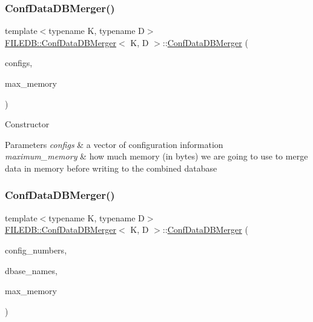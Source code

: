 \subsubsection{\texorpdfstring{ConfDataDBMerger()}{ConfDataDBMerger()}\hspace{0.1cm}{\footnotesize\ttfamily [3/4]}}
{\footnotesize\ttfamily template$<$typename K, typename D$>$ \\
\mbox{\hyperlink{classFILEDB_1_1ConfDataDBMerger}{F\+I\+L\+E\+D\+B\+::\+Conf\+Data\+D\+B\+Merger}}$<$ K, D $>$\+::\mbox{\hyperlink{classFILEDB_1_1ConfDataDBMerger}{Conf\+Data\+D\+B\+Merger}} (\begin{DoxyParamCaption}\item[{const std\+::vector$<$ \mbox{\hyperlink{classFILEDB_1_1ConfigInfo}{Config\+Info}} $>$ \&}]{configs,  }\item[{unsigned int}]{max\+\_\+memory }\end{DoxyParamCaption})\hspace{0.3cm}{\ttfamily [inline]}}

Constructor 
\begin{DoxyParams}{Parameters}
{\em configs} & a vector of configuration information \\
\hline
{\em maximum\+\_\+memory} & how much memory (in bytes) we are going to use to merge data in memory before writing to the combined database \\
\hline
\end{DoxyParams}
\mbox{\label{classFILEDB_1_1ConfDataDBMerger_a495cdfd447f2ed64776d87601c36a05b}} 
\subsubsection{\texorpdfstring{ConfDataDBMerger()}{ConfDataDBMerger()}\hspace{0.1cm}{\footnotesize\ttfamily [4/4]}}
{\footnotesize\ttfamily template$<$typename K, typename D$>$ \\
\mbox{\hyperlink{classFILEDB_1_1ConfDataDBMerger}{F\+I\+L\+E\+D\+B\+::\+Conf\+Data\+D\+B\+Merger}}$<$ K, D $>$\+::\mbox{\hyperlink{classFILEDB_1_1ConfDataDBMerger}{Conf\+Data\+D\+B\+Merger}} (\begin{DoxyParamCaption}\item[{const std\+::vector$<$ int $>$ \&}]{config\+\_\+numbers,  }\item[{const std\+::vector$<$ std\+::string $>$ \&}]{dbase\+\_\+names,  }\item[{unsigned int}]{max\+\_\+memory }\end{DoxyParamCaption})\hspace{0.3cm}{\ttfamily [inline]}}

